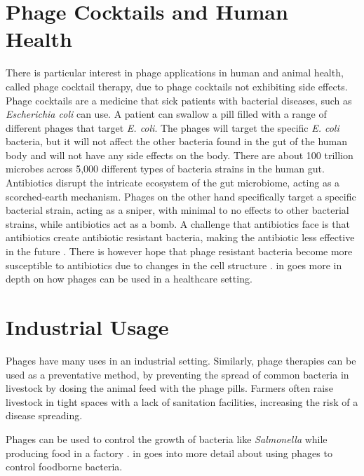 \section{Phage Cocktails and Human Health}
There is particular interest in phage applications in human and animal health, called phage cocktail therapy, due to phage cocktails not exhibiting side effects.
Phage cocktails are a medicine that sick patients with bacterial diseases, such as \textit{Escherichia coli} can use. 
A patient can swallow a pill filled with a range of different phages that target \textit{E. coli}.
The phages will target the specific \textit{E. coli} bacteria, but it will not affect the other bacteria found in the gut of the human body and will not have any side effects on the body. 
There are about 100 trillion microbes across 5,000 different types of bacteria strains in the human gut. 
Antibiotics disrupt the intricate ecosystem of the gut microbiome, acting as a scorched-earth mechanism. 
Phages on the other hand specifically target a specific bacterial strain, acting as a sniper, with minimal to no effects to other bacterial strains, while antibiotics act as a bomb. 
A challenge that antibiotics face is that antibiotics create antibiotic resistant bacteria, making the antibiotic less effective in the future \cite{odonkorBacteriaResistanceAntibiotics2011, volkovaEffectsEarlylifePenicillin2021}. 
There is however hope that phage resistant bacteria become more susceptible to antibiotics due to changes in the cell structure \cite{laurePhageResistancemediatedTradeoffs2022, zhaoPhagedrivenCoevolutionReveals2024}. 
 in  goes more in depth on how phages can be used in a healthcare setting. 

\section{Industrial Usage}
Phages have many uses in an industrial setting. 
Similarly, phage therapies can be used as a preventative method, by preventing the spread of common bacteria in livestock by dosing the animal feed with the phage pills. 
Farmers often raise livestock in tight spaces with a lack of sanitation facilities, increasing the risk of a disease spreading. 
 
Phages can be used to control the growth of bacteria like \textit{Salmonella} while producing food in a factory \cite{sofferBacteriophagesSafelyReduce2016, kowalskaFreshVegetablesFruit2023}. 
 in  goes into more detail about using phages to control foodborne bacteria. 

